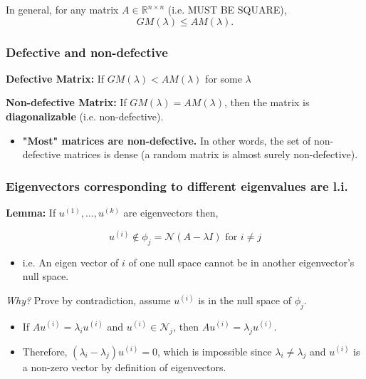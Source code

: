 \begin{theorem}
    In general, for any matrix $A \in \mathbb{R}^{n \times n}$ (i.e. MUST BE SQUARE),
    \[
    GM(\lambda) \leq AM(\lambda).
    \]
\end{theorem}

\subsubsection{Defective and non-defective}
\begin{definition}

    \textbf{Defective Matrix:} If $GM(\lambda) < AM(\lambda)$ for some $\lambda$
    \vspace{1em}

    \textbf{Non-defective Matrix:} If $GM(\lambda) = AM(\lambda)$, then the matrix is \textbf{diagonalizable} (i.e. non-defective).
    \begin{itemize}
        \item \textbf{"Most" matrices are non-defective.} In other words, the set of non-defective matrices is dense (a random matrix is almost surely non-defective).
    \end{itemize}

\end{definition}

\subsubsection{Eigenvectors corresponding to different eigenvalues are l.i.}
\begin{theorem}
    \textbf{Lemma:} If $u^{(1)}, \ldots, u^{(k)}$ are eigenvectors then,

    \begin{equation}
        u^{(i)} \notin \phi_j = \mathcal{N}(A-\lambda I) \text{ for } i \neq j
    \end{equation} 

    \begin{itemize}
        \item i.e. An eigen vector of $i$ of one null space cannot be in another eigenvector's null space. 
    \end{itemize}
\end{theorem}

\begin{derivation}
    \textit{Why?} Prove by contradiction, assume $u^{(i)}$ is in the null space of $\phi_j$.
    \begin{itemize}
        \item If $A u^{(i)} = \lambda_i u^{(i)}$ and $u^{(i)} \in \mathcal{N}_j$, then $A u^{(i)} = \lambda_j u^{(i)}$. 
        \item Therefore, $(\lambda_i - \lambda_j) u^{(i)} = 0$, which is impossible since $\lambda_i \neq \lambda_j$ and $u^{(i)}$ is a non-zero vector by definition of eigenvectors. 
    \end{itemize}   
\end{derivation}

